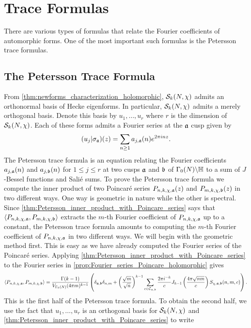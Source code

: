 \chapter{Trace Formulas}
  There are various types of formulas that relate the Fourier coefficients of automorphic forms. One of the most important such formulas is the Petersson trace formulas.
  \section{The Petersson Trace Formula}
    From \cref{thm:newforms_characterization_holomorphic}, $\mathcal{S}_{k}(N,\chi)$ admits an orthonormal basis of Hecke eigenforms. In particular, $\mathcal{S}_{k}(N,\chi)$ admits a merely orthogonal basis. Denote this basis by $u_{1},\ldots,u_{r}$ where $r$ is the dimension of $\mathcal{S}_{k}(N,\chi)$. Each of these forms admits a Fourier series at the $\mathfrak{a}$ cusp given by
    \[
      (u_{j}|\sigma_{\mathfrak{a}})(z) = \sum_{n \ge 1}a_{j,\mathfrak{a}}(n)e^{2\pi inz}.
    \]
    The Petersson trace formula is an equation relating the Fourier coefficients $a_{j,\mathfrak{a}}(n)$ and $a_{j,\mathfrak{b}}(n)$ for $1 \le j \le r$ at two cusps $\mathfrak{a}$ and $\mathfrak{b}$ of $\Gamma_{0}(N)\backslash\mathbb{H}$ to a sum of $J$-Bessel functions and Sali\'e sums. To prove the Petersson trace formula we compute the inner product of two Poincar\'e series $P_{n,k,\chi,\mathfrak{a}}(z)$ and $P_{m,k,\chi,\mathfrak{b}}(z)$ in two different ways. One way is geometric in nature while the other is spectral. Since \cref{thm:Petersson_inner_product_with_Poincare_series} says that $\langle P_{n,k,\chi,\mathfrak{a}},P_{m,k,\chi,\mathfrak{b}}\rangle$ extracts the $m$-th Fourier coefficient of $P_{n,k,\chi,\mathfrak{a}}$ up to a constant, the Petersson trace formula amounts to computing the $m$-th Fourier coefficient of $P_{n,k,\chi,\mathfrak{a}}$ in two different ways. We will begin with the geometric method first. This is easy as we have already computed the Fourier series of the Poincar\'e series. Applying \cref{thm:Petersson_inner_product_with_Poincare_series} to the Fourier series in \cref{prop:Fourier_series_Poincare_holomorphic} gives
    \[
      \langle P_{n,k,\chi,\mathfrak{a}},P_{m,k,\chi,\mathfrak{b}}\rangle = \frac{\Gamma(k-1)}{V_{\Gamma_{0}(N)}(4\pi m)^{k-1}}\left(\delta_{\mathfrak{a},\mathfrak{b}}\delta_{n,m}+\left(\frac{\sqrt{m}}{\sqrt{n}}\right)^{k-1}\sum_{c \in \mathcal{C}_{\mathfrak{a},\mathfrak{b}}}\frac{2\pi i^{-k}}{c}J_{k-1}\left(\frac{4\pi\sqrt{nm}}{c}\right)S_{\chi,\mathfrak{a},\mathfrak{b}}(n,m,c)\right).
    \]
    This is the first half of the Petersson trace formula. To obtain the second half, we use the fact that $u_{1},\ldots,u_{r}$ is an orthogonal basis for $\mathcal{S}_{k}(N,\chi)$ and \cref{thm:Petersson_inner_product_with_Poincare_series} to write
